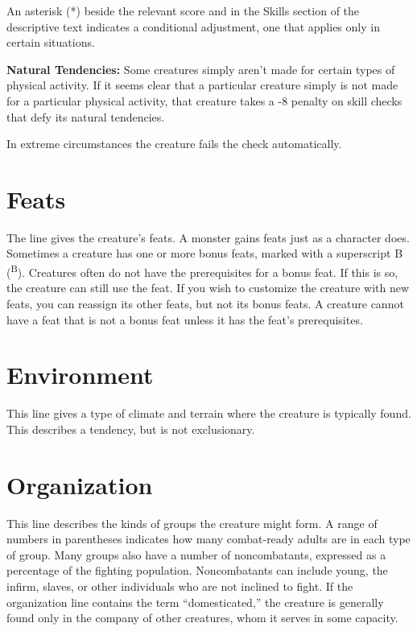 \documentclass{article}
\begin{document}
An asterisk (*) beside the relevant score and in the Skills section of the descriptive 
text indicates a conditional adjustment, one that applies only in certain situations.

\textbf{Natural Tendencies:} Some creatures simply aren't made for certain types 
of physical activity. If it seems clear that a particular creature simply is not 
made for a particular physical activity, that creature takes a -8 penalty on skill 
checks that defy its natural tendencies.

In extreme circumstances the creature fails the check automatically.

\section*{\textbf{Feats}}

The line gives the creature's feats. A monster gains feats just as a character 
does. Sometimes a creature has one or more bonus feats, marked with a superscript 
B (\textsuperscript{B}). Creatures often do not have the prerequisites for a bonus 
feat. If this is so, the creature can still use the feat. If you wish to customize 
the creature with new feats, you can reassign its other feats, but not its bonus 
feats. A creature cannot have a feat that is not a bonus feat unless it has the 
feat's prerequisites.

\section*{\textbf{Environment}}

This line gives a type of climate and terrain where the creature is typically found. 
This describes a tendency, but is not exclusionary.

\section*{\textbf{Organization}}

This line describes the kinds of groups the creature might form. A range of numbers 
in parentheses indicates how many combat-ready adults are in each type of group. 
Many groups also have a number of noncombatants, expressed as a percentage of the 
fighting population. Noncombatants can include young, the infirm, slaves, or other 
individuals who are not inclined to fight. If the organization line contains the 
term ``domesticated,'' the creature is generally found only in the company of other 
creatures, whom it serves in some capacity.
\end{document}
